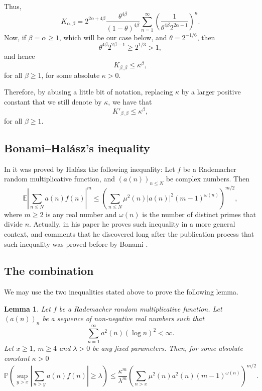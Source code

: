 \documentclass[reqno0,12pt]{amsart}
\newtheorem{lemma}{Lemma}[section]
\theoremstyle{remark}
\newcommand{\EE}{\mathbb{E}}
\newcommand{\PP}{\mathbb{P}}
\begin{document}
Thus,
$$K_{\alpha, \beta}= 2^{2\alpha+4\beta}\frac{\theta^{4\beta}}{(1-\theta)^{4\beta}}\sum_{n=1}^\infty\left(\frac{1}{\theta^{4\beta}2^{2\alpha-1}}\right)^n.$$
Now, if $\beta=\alpha\geq 1$, which will be our case below, and $\theta=2^{-1/6}$, then 
$$\theta^{4\beta}2^{2\beta-1}\geq 2^{1/3}>1,$$ 
and hence
$$K_{\beta, \beta}\leq \kappa^{\beta},$$
for all $\beta\geq 1$, for some absolute $\kappa>0$.

Therefore, by abusing a little bit of notation, replacing $\kappa$ by a larger positive constant that we still denote by $\kappa$, we have that
$$K'_{\beta, \beta}\leq \kappa^\beta,$$
for all $\beta\geq 1$.

\subsection{Bonami--Halász's inequality} In \cite{halasz} it was proved by Halász the following inequality: Let $f$ be a Rademacher random multiplicative function, and $(a(n))_{n\leq N}$ be complex numbers. Then
$$\EE \left|\sum_{n\leq N}a(n)f(n)\right|^{m}\leq \left(\sum_{n\leq N}\mu^2(n)|a(n)|^2(m-1)^{\omega(n)}\right)^{m/2},$$
where $m\geq 2$ is any real number and $\omega(n)$ is the number of distinct primes that divide $n$. Actually, in his paper he proves such inequality in a more general context, and comments that he discovered long after the publication process that such inequality was proved before by Bonami \cite{bonami_inequality}. 

\subsection{The combination} We may use the two inequalities stated above to prove the following lemma.

\begin{lemma}\label{lemma maximal inequality}
Let $f$ be a Rademacher random multiplicative function. Let $(a(n))_n$ be a sequence of non-negative real numbers such that 
$$\sum_{n=1}^\infty a^2(n)(\log n)^2<\infty.$$
Let $x\geq 1$, $m\geq 4$ and $\lambda>0$ be any fixed parameters. Then, for some absolute constant $\kappa>0$
$$\PP\left(\sup_{y>x}\left|\sum_{n>y} a(n)f(n)\right|\geq \lambda\right)\leq \frac{\kappa^{m}}{\lambda^m}\left(\sum_{n>x}\mu^2(n)a^2(n)(m-1)^{\omega(n)}\right)^{m/2}.$$
\end{lemma}
\end{document}
